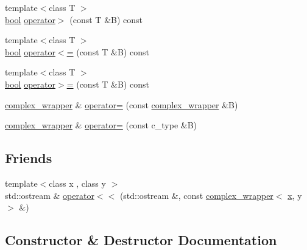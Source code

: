 \begin{DoxyCompactItemize}
\item 
{\footnotesize template$<$class T $>$ }\\\hyperlink{compiler_8h_abb452686968e48b67397da5f97445f5b}{bool} \hyperlink{classcomplex__wrapper_aa58c61b8b13943e99c0b8b9017decf32}{operator$>$} (const T \&B) const 
\item 
{\footnotesize template$<$class T $>$ }\\\hyperlink{compiler_8h_abb452686968e48b67397da5f97445f5b}{bool} \hyperlink{classcomplex__wrapper_a4b1f029a99590660cb734464b3f2110e}{operator$<$=} (const T \&B) const 
\item 
{\footnotesize template$<$class T $>$ }\\\hyperlink{compiler_8h_abb452686968e48b67397da5f97445f5b}{bool} \hyperlink{classcomplex__wrapper_a5f6942d1bba2d975e9b50b3a398c17a1}{operator$>$=} (const T \&B) const 
\item 
\hyperlink{classcomplex__wrapper}{complex\+\_\+wrapper} \& \hyperlink{classcomplex__wrapper_a4df94c1bb4abcf25a42f2dddeb2ecda9}{operator=} (const \hyperlink{classcomplex__wrapper}{complex\+\_\+wrapper} \&B)
\item 
\hyperlink{classcomplex__wrapper}{complex\+\_\+wrapper} \& \hyperlink{classcomplex__wrapper_ae1da014598f805eb8f4dd00a9ddf89fb}{operator=} (const c\+\_\+type \&B)
\end{DoxyCompactItemize}
\subsection*{Friends}
\begin{DoxyCompactItemize}
\item 
{\footnotesize template$<$class x , class y $>$ }\\std\+::ostream \& \hyperlink{classcomplex__wrapper_ac493ef9d52d02b8717be436678f17dd8}{operator$<$$<$} (std\+::ostream \&, const \hyperlink{classcomplex__wrapper}{complex\+\_\+wrapper}$<$ \hyperlink{vecnorm1_8cc_ac73eed9e41ec09d58f112f06c2d6cb63}{x}, y $>$ \&)
\end{DoxyCompactItemize}


\subsection{Constructor \& Destructor Documentation}
\hypertarget{classcomplex__wrapper_a6f027999d375bf7337f70188d937a470}{}
